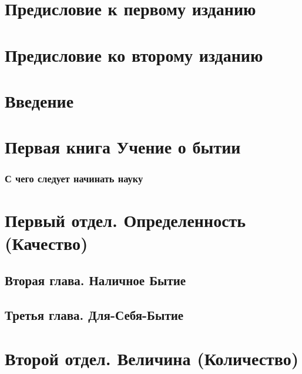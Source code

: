 \documentclass[b5paper, 11pt, twoside, onecolumn, openany]{memoir}
\begin{document}
\part[Предисловие к первому изданию]{Предисловие к первому изданию}


\part[Предисловие ко второму изданию]{Предисловие ко второму изданию}


\part[Введение]{Введение}


\mainmatter

\part[Первая книга \newline УЧЕНИЕ О БЫТИИ]{Первая книга Учение о бытии}
\section[С чего следует начинать науку]{С чего следует начинать науку}
\pagestyle{plain}
\setcounter{page}{1}


\part[Первый отдел \newline ОПРЕДЕЛЕННОСТЬ (КАЧЕСТВО)]{Первый отдел. Определенность (Качество)}


\chapter[{\em Вторая глава} Наличное Бытие]{Вторая глава. Наличное Бытие}


\chapter[{\em Третья глава} Для-себя-бытие]{ Третья глава. Для-Себя-Бытие}



\part[{\em Второй отдел} \newline ВЕЛИЧИНА (КОЛИЧЕСТВО)]{Второй отдел. Величина (Количество)}

\end{document}
